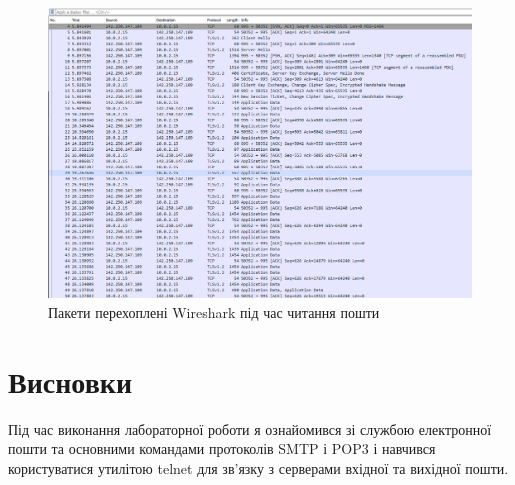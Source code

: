 \documentclass{article}
\begin{document}
\begin{normalsize}
\begin{figure}[H]
	\centering
	\includegraphics[width=\textwidth]{31}
	\caption{Пакети перехоплені Wireshark під час читання пошти}
\end{figure}

\section*{Висновки}
Під час виконання лабораторної роботи я ознайомився зі службою електронної пошти та основними командами протоколів SMTP і POP3 і навчився користуватися утилітою telnet для зв’язку з серверами вхідної та вихідної пошти.
	    
\end{normalsize}
\end{document}
